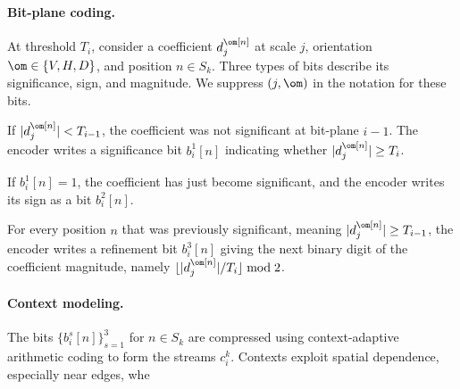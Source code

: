   
\paragraph{Bit-plane coding.}

At threshold $T_i$, consider a coefficient $d_j^\om[n]$ at scale $j$, orientation $\om\in\{V,H,D\}$, and position $n\in S_k$. Three types of bits describe its significance, sign, and magnitude. We suppress $(j,\om)$ in the notation for these bits.
\begin{rs}
	\item If $|d_j^\om[n]|<T_{i-1}$, the coefficient was not significant at bit-plane $i-1$. The encoder writes a significance bit
		$b_i^1[n]$ indicating whether $|d_j^\om[n]|\geq T_i$.
	\item If $b_i^1[n]=1$, the coefficient has just become significant, and the encoder writes its sign as a bit $b_i^2[n]$.
	\item For every position $n$ that was previously significant, meaning $|d_j^\om[n]|\geq T_{i-1}$, the encoder writes a refinement bit
		 $b_i^3[n]$ giving the next binary digit of the coefficient magnitude, namely $\lfloor|d_j^\om[n]|/T_i\rfloor\bmod2$.
\end{rs}

  
\paragraph{Context modeling.}

The bits $\{ b_i^s[n] \}_{s=1}^3$ for $n\in S_k$ are compressed using context-adaptive arithmetic coding to form the streams $c_i^k$. Contexts exploit spatial dependence, especially near edges, whe